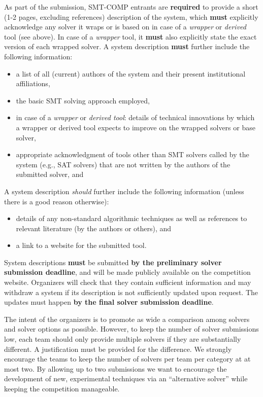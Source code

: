 \documentclass[12pt]{article}
\begin{document}
%
As part of the submission, SMT-COMP entrants are \textbf{required} to provide a
short (1-2 pages, excluding references) description of the system, which \textbf{must} explicitly
acknowledge any solver it wraps or is based on in case of a \emph{wrapper} or
\emph{derived} tool (see above).
In case of a \emph{wrapper} tool, it \textbf{must} also explicitly state
the exact version of each wrapped solver.
A system description \textbf{must} further include the following information:
\begin{itemize}[itemsep=0ex]
  \item a list of all (current) authors of the system and their present institutional
    affiliations,
  \item the basic SMT solving approach employed,
  \item in case of a \emph{wrapper} or \emph{derived tool}: details of
    technical innovations by which a wrapper or derived tool expects to improve
    on the wrapped solvers or base solver,
  \item appropriate acknowledgment of tools other than SMT solvers called by
    the system (e.g., SAT solvers) that are not written by the authors of the
    submitted solver, and
\end{itemize}
A system description \emph{should} further include the following information
(unless there is a good reason otherwise):
\begin{itemize}[itemsep=0ex]
  \item details of any non-standard algorithmic techniques as well as
    references to relevant literature (by the authors or others), and
  \item a link to a website for the submitted tool.
\end{itemize}
System descriptions \textbf{must} be submitted \textbf{by the preliminary solver
submission deadline}, and will be made publicly available on the competition website.
Organizers will check that they contain sufficient information
and may withdraw a system if its description is not sufficiently updated upon
request. The updates must happen \textbf{by the final solver submission deadline}.

%
The intent of the organizers is to promote as wide a comparison among
solvers and solver options as possible.  However, to keep the number of
solver submissions low, each team should only provide multiple solvers
if they are  substantially different.  A justification must be provided
for the difference.  We strongly encourage the teams to keep the number
of solvers per team per category at at most two. By allowing
up to two submissions we want to encourage the development of new,
experimental techniques via an ``alternative solver'' while keeping
the competition manageable.
\end{document}
